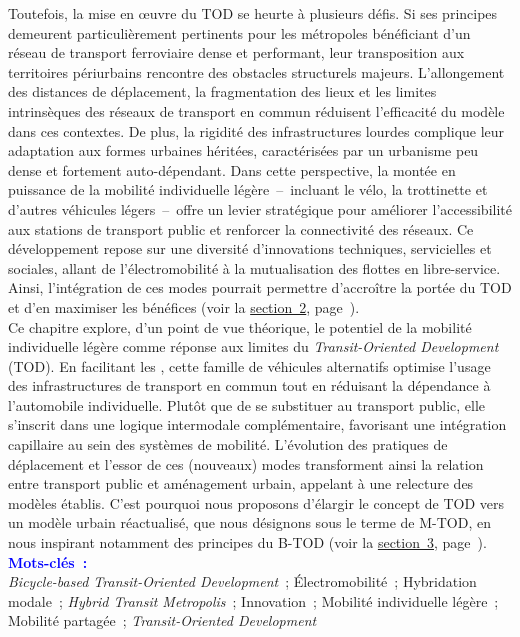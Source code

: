 \begin{refsegment}
\begin{tcolorbox}
{Toutefois, la mise en œuvre du \acrshort{TOD} se heurte à plusieurs défis. Si ses principes demeurent particulièrement pertinents pour les métropoles bénéficiant d’un réseau de transport ferroviaire dense et performant, leur transposition aux territoires périurbains rencontre des obstacles structurels majeurs. L’allongement des distances de déplacement, la fragmentation des lieux et les limites intrinsèques des réseaux de transport en commun réduisent l’efficacité du modèle dans ces contextes. De plus, la rigidité des infrastructures lourdes complique leur adaptation aux formes urbaines héritées, caractérisées par un urbanisme peu dense et fortement auto-dépendant. Dans cette perspective, la montée en puissance de la mobilité individuelle légère~–~incluant le vélo, la trottinette et d’autres véhicules légers~–~offre un levier stratégique pour améliorer l’accessibilité aux stations de transport public et renforcer la connectivité des réseaux. Ce développement repose sur une diversité d’innovations techniques, servicielles et sociales, allant de l’électromobilité à la mutualisation des flottes en libre-service. Ainsi, l’intégration de ces modes pourrait permettre d’accroître la portée du \acrshort{TOD} et d’en maximiser les bénéfices (voir la \hyperref[chap1:mobilite-individuelle-legere]{section~2}, page~\pageref{chap1:mobilite-individuelle-legere}).
    \\
Ce chapitre explore, d’un point de vue théorique, le potentiel de la mobilité individuelle légère comme réponse aux limites du \textsl{Transit-Oriented Development} (\acrshort{TOD}). En facilitant les , cette famille de véhicules alternatifs optimise l’usage des infrastructures de transport en commun tout en réduisant la dépendance à l’automobile individuelle. Plutôt que de se substituer au transport public, elle s’inscrit dans une logique intermodale complémentaire, favorisant une intégration capillaire au sein des systèmes de mobilité. L’évolution des pratiques de déplacement et l’essor de ces (nouveaux) modes transforment ainsi la relation entre transport public et aménagement urbain, appelant à une relecture des modèles établis. C'est pourquoi nous proposons d’élargir le concept de \acrshort{TOD} vers un modèle urbain réactualisé, que nous désignons sous le terme de \acrshort{M-TOD}, en nous inspirant notamment des principes du \acrshort{B-TOD} (voir la \hyperref[chap1:btod]{section~3}, page~\pageref{chap1:btod}).
    }
    \tcblower
\Large{\textcolor{blue}{\textbf{Mots-clés~:}}}
    \\
    \small{
\textsl{Bicycle-based Transit-Oriented Development}~;
Électromobilité~;
Hybridation modale~;
\textsl{Hybrid Transit Metropolis}~;
Innovation~;
Mobilité individuelle légère~;
Mobilité partagée~;
\textsl{Transit-Oriented Development}
    }
    \end{tcolorbox}


\end{refsegment}
